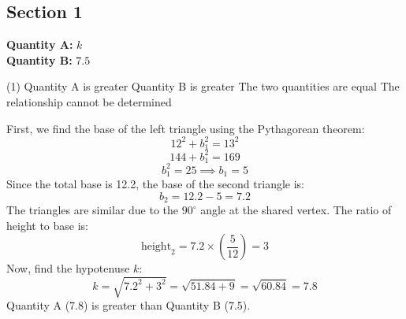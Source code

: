 \documentclass[11pt,paper=a4,answers]{exam}
\begin{document}
\begin{questions}
\pointsinrightmargin
\pointsdroppedatright
\marksnotpoints
{}
\pointformat{\boldmath\themarginpoints}
\bracketedpoints
\section*{Section 1}



\question
\begin{center}
\end{center}

\textbf{Quantity A: } $k$ \\
\textbf{Quantity B: } $7.5$

\begin{tasks}(1)
\task[A)] Quantity A is greater
\task[B)] Quantity B is greater
\task[C)] The two quantities are equal
\task[D)] The relationship cannot be determined
\end{tasks}

\begin{solution}
First, we find the base of the left triangle using the Pythagorean theorem:
\vspace{5pt}
\[ 12^2 + b_1^2 = 13^2 \]
\vspace{5pt}
\[ 144 + b_1^2 = 169 \]
\vspace{5pt}
\[ b_1^2 = 25 \implies b_1 = 5 \]
\vspace{5pt}
Since the total base is 12.2, the base of the second triangle is:
\vspace{5pt}
\[ b_2 = 12.2 - 5 = 7.2 \]
\vspace{5pt}
The triangles are similar due to the $90^\circ$ angle at the shared vertex. The ratio of height to base is:
\vspace{5pt}
\[ \text{height}_2 = 7.2 \times \left( \dfrac{5}{12} \right) = 3 \]
\vspace{5pt}
Now, find the hypotenuse $k$:
\vspace{5pt}
\[ k = \sqrt{7.2^2 + 3^2} = \sqrt{51.84 + 9} = \sqrt{60.84} = 7.8 \]
\vspace{5pt}
Quantity A (7.8) is greater than Quantity B (7.5).


\end{solution}
\end{questions}
\end{document}
